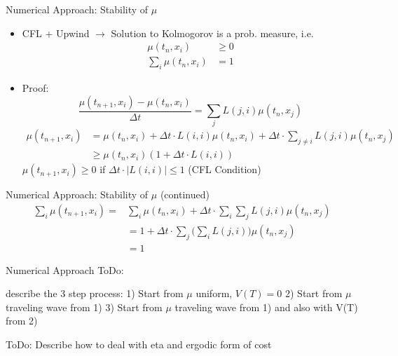 \documentclass{beamer}
\begin{document}
	\begin{frame}{Numerical Approach: Stability of $\mu$}
		\begin{itemize}
			\item CFL + Upwind $\rightarrow$ Solution to Kolmogorov is a prob. measure, i.e.
			\begin{equation}
			\begin{split}
			\mu(t_n,x_i) & \geq 0 \\
			\sum_i \mu(t_n,x_i) &= 1
			\end{split}
			\end{equation}
			\item Proof:
			\begin{equation}
			\frac{\mu(t_{n+1},x_i)-\mu(t_{n},x_i)}{\Delta t}=\sum_{j} L(j,i) \mu(t_n,x_j)
			\end{equation}
			\begin{equation}
			\begin{split}
			\mu(t_{n+1},x_i)&=\mu(t_{n},x_i)+ \Delta t \cdot L(i,i)\mu(t_n,x_i) + \Delta t \cdot \sum_{j\neq i} L(j,i) \mu(t_n,x_j)  \\
			& \geq \mu(t_{n},x_i) (1+ \Delta t \cdot L(i,i))
			\end{split}
			\end{equation}
			$\mu(t_{n+1},x_i) \geq 0$ if $\Delta t \cdot| L(i,i)| \leq 1$ (CFL Condition)
		\end{itemize}
	\end{frame}
	
	\begin{frame}{Numerical Approach: Stability of $\mu$ (continued)}
		\begin{equation}
		\begin{split}
		\sum_i \mu(t_{n+1},x_i)=& \sum_i \mu(t_{n},x_i)+\Delta t \cdot \sum_i \sum_{j} L(j,i) \mu(t_n,x_j) \\
		& = 1 + \Delta t \cdot \sum_j \Big(\sum_i L(j,i)\Big) \mu(t_n,x_j) \\
		& = 1
		\end{split}
		\end{equation}
	\end{frame}
	
\begin{frame}{Numerical Approach}
ToDo:

describe the 3 step process:
1) Start from $\mu$ uniform, $V(T)=0$
2) Start from $\mu$ traveling wave from 1)
3) Start from $\mu$ traveling wave from 1) and also with V(T) from 2)


ToDo:
Describe how to deal with eta and ergodic form of cost
\end{frame}
\end{document}
